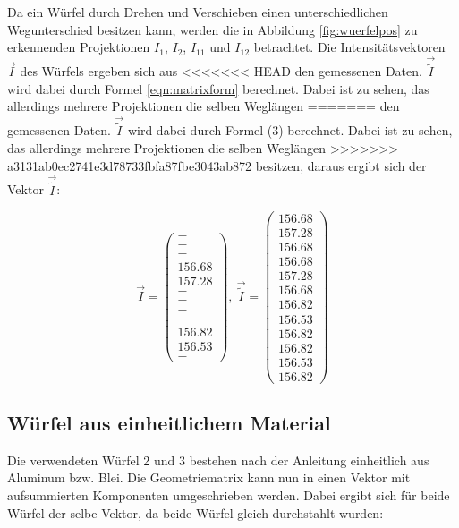 Da ein Würfel durch Drehen und Verschieben einen unterschiedlichen Wegunterschied
besitzen kann, werden die in Abbildung \ref{fig:wuerfelpos} zu erkennenden Projektionen
$I_1$, $I_2$, $I_11$ und $I_12$ betrachtet. Die Intensitätsvektoren $\vec{I}$ des Würfels ergeben sich aus
<<<<<<< HEAD
den gemessenen Daten. $\vec{\tilde{I}}$ wird dabei durch Formel \eqref{eqn:matrixform} berechnet. Dabei ist zu sehen, das allerdings mehrere Projektionen die selben Weglängen
=======
den gemessenen Daten. $\vec{\tilde{I}}$ wird dabei durch Formel (3) berechnet. Dabei ist zu sehen, das allerdings mehrere Projektionen die selben Weglängen
>>>>>>> a3131ab0ec2741e3d78733fbfa87fbe3043ab872
besitzen, daraus ergibt sich der Vektor $\vec{\tilde{I}}$:

\begin{equation*}
  \vec{I}=\begin{pmatrix}
        - \\
        - \\
        - \\
        156.68  \\
        157.28  \\
        - \\
        - \\
        - \\
        - \\
        156.82 \\
        156.53 \\
        -
  \end{pmatrix},\
  \vec{\tilde{I}}=\begin{pmatrix}
        156.68 \\
        157.28 \\
        156.68 \\
        156.68 \\
        157.28 \\
        156.68 \\
        156.82 \\
        156.53 \\
        156.82 \\
        156.82 \\
        156.53 \\
        156.82
  \end{pmatrix}
\end{equation*}


\subsection{Würfel aus einheitlichem Material}
Die verwendeten Würfel 2 und 3 bestehen nach der Anleitung einheitlich aus Aluminum bzw.
Blei. Die Geometriematrix kann nun in einen
Vektor mit aufsummierten Komponenten umgeschrieben werden. Dabei ergibt sich für beide
Würfel der selbe Vektor, da beide Würfel gleich durchstahlt wurden:

